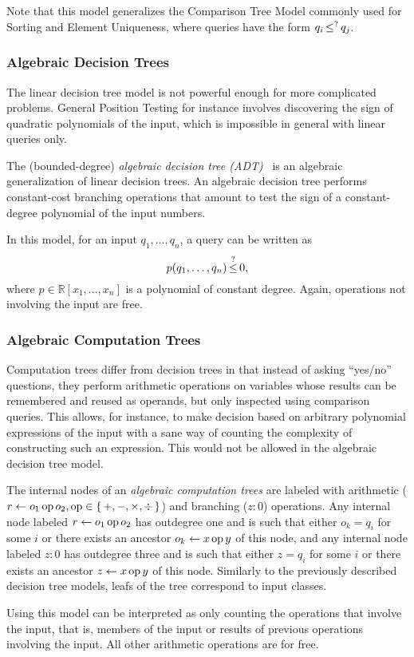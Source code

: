 Note that this model generalizes the Comparison Tree Model commonly used for
Sorting and Element Uniqueness, where queries have the form \(q_i \mathop{\leq}^{?}
q_j\).

\subsubsection{Algebraic Decision Trees}
The linear decision tree model is not powerful enough for more complicated
problems. General Position Testing for instance involves discovering the sign
of quadratic polynomials of the input, which is impossible in general with
linear queries only.

The (bounded-degree) \emph{algebraic decision tree (ADT)}~\cite{R72,Y81,SY82}
is an algebraic generalization of linear decision trees.
An algebraic decision tree performs constant-cost branching operations that
amount to test the sign of
a constant-degree polynomial of the input numbers.

In this model, for an input \(q_1,\ldots,q_n\), a query can be written as
\begin{displaymath}
	p(q_1, \ldots, q_n) \mathop{\le}^{?} 0,
\end{displaymath}
where \(p \in \mathbb{R}[x_1,\ldots, x_n]\) is a polynomial of constant
degree. Again, operations not involving the input are free.

\subsubsection{Algebraic Computation Trees}
Computation trees differ from decision trees in that instead of asking
``yes/no'' questions, they perform arithmetic operations on variables whose
results can be remembered and reused as operands, but only inspected using
comparison queries. This allows, for instance, to make decision based on
arbitrary polynomial expressions of the input with a sane way of counting the
complexity of constructing such an expression. This would not be allowed in
the algebraic decision tree model.

The internal nodes of an \emph{algebraic computation trees} are labeled with
arithmetic (\(r \gets o_1 \operatorname{op} o_2, \operatorname{op} \in \{\,+,-,\times,\div\,\}\)) and
branching (\(z : 0\)) operations. Any internal node labeled \(r \gets o_1 \operatorname{op}
o_2\) has outdegree one and is
such that either \(o_k = q_i\) for some \(i\) or there exists an ancestor \(o_k
\gets x \operatorname{op} y\) of this node, and any internal node labeled \(z : 0\) has
outdegree three and is such that either \(z = q_i\) for some \(i\) or there
exists an ancestor \(z \gets x \operatorname{op} y\) of this node.
Similarly to the previously described decision tree models, leafs of the tree
correspond to input classes.

Using this model can be interpreted as only counting the operations that
involve the input, that is, members of the input or results of previous
operations involving the input. All other arithmetic operations are for free.

